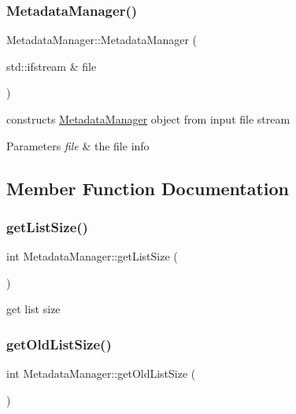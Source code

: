 \subsubsection{\texorpdfstring{Metadata\+Manager()}{MetadataManager()}}
{\footnotesize\ttfamily Metadata\+Manager\+::\+Metadata\+Manager (\begin{DoxyParamCaption}\item[{std\+::ifstream \&}]{file }\end{DoxyParamCaption})}

constructs \hyperlink{classMetadataManager}{Metadata\+Manager} object from input file stream 
\begin{DoxyParams}{Parameters}
{\em file} & the file info \\
\hline
\end{DoxyParams}


\subsection{Member Function Documentation}
\mbox{\label{classMetadataManager_af1bbbc6018d54c4ec84e02829da27b99}} 
\subsubsection{\texorpdfstring{get\+List\+Size()}{getListSize()}}
{\footnotesize\ttfamily int Metadata\+Manager\+::get\+List\+Size (\begin{DoxyParamCaption}{ }\end{DoxyParamCaption})}

get list size \mbox{\label{classMetadataManager_a5a98daedda8a707f14a39457bdd34354}} 
\subsubsection{\texorpdfstring{get\+Old\+List\+Size()}{getOldListSize()}}
{\footnotesize\ttfamily int Metadata\+Manager\+::get\+Old\+List\+Size (\begin{DoxyParamCaption}{ }\end{DoxyParamCaption})}

